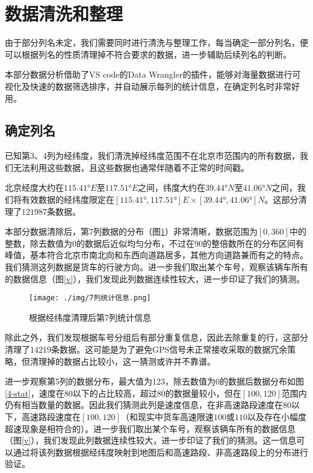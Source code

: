 \documentclass[UTF8]{ctexart}
\begin{document}
\section{数据清洗和整理}

由于部分列名未定，我们需要同时进行清洗与整理工作，每当确定一部分列名，便可以根据列名的性质清理掉不符合要求的数据，进一步辅助后续列名的判断。

本部分数据分析借助了VS code的Data Wrangler的插件，能够对海量数据进行可视化及快速的数据筛选排序，并自动展示每列的统计信息，在确定列名时非常好用。

\subsection{确定列名}


已知第3、4列为经纬度，我们清洗掉经纬度范围不在北京市范围内的所有数据，我们无法利用这些数据，且这些数据也通常伴随着不正常的时间戳。

北京经度大约在$115.41°E$至$117.51°E$之间，纬度大约在$39.44°N$至$41.06°N$之间，我们将有效数据的经纬度限定在$[115.41°,117.51°]E\times [39.44°, 41.06°]N$。这部分清理了$121987$条数据。

本部分数据清除后，第7列数据的分布（图\ref{7-stat}）非常清晰，数据范围为$[0,360]$中的整数，除去数值为$0$的数据后近似均匀分布，不过在$90$的整倍数所在的分布区间有峰值，基本符合北京市南北向和东西向道路居多，其他方向道路兼而有之的特点。我们猜测这列数据是货车的行驶方向。进一步我们取出某个车号，观察该辆车所有的数据信息（图\ref{v}），我们发现此列数据连续性较大，进一步印证了我们的猜测。

\begin{figure}[!htb]
    \centering
    \texttt{[image: ./img/7列统计信息.png]}
    \caption{根据经纬度清理后第7列统计信息}
    \label{7-stat}
\end{figure}

除此之外，我们发现根据车号分组后有部分重复信息，因此去除重复的行，这部分清理了$14219$条数据。这可能是为了避免GPS信号未正常接收采取的数据冗余策略，但清理掉的数据占比较小，这一猜测或许并不靠谱。

进一步观察第5列的数据分布，最大值为123，除去数值为$0$的数据后数据分布如图\ref{4-stat}，速度在80以下的占比较高，超过80的数据量较小，但在$[100,120]$范围内仍有相当数量的数据。因此我们猜测此列是速度信息，在非高速路段速度在$80$以下，高速路段速度在$[100,120]$（和现实中货车高速限速$100$或$110$以及存在小幅度超速现象是相符合的）。进一步我们取出某个车号，观察该辆车所有的数据信息（图\ref{v}），我们发现此列数据连续性较大，进一步印证了我们的猜测。这一信息可以通过将该列数据根据经纬度映射到地图后和高速路段、非高速路段上的分布进行验证。
\end{document}
